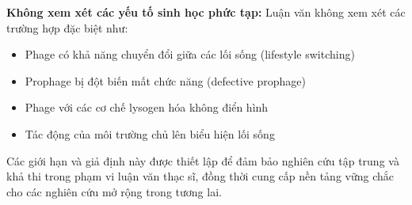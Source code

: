 \textbf{Không xem xét các yếu tố sinh học phức tạp:} Luận văn không xem xét các trường hợp đặc biệt như:
\begin{itemize}
    \item Phage có khả năng chuyển đổi giữa các lối sống (lifestyle switching)
    \item Prophage bị đột biến mất chức năng (defective prophage)
    \item Phage với các cơ chế lysogen hóa không điển hình
    \item Tác động của môi trường chủ lên biểu hiện lối sống
\end{itemize}

Các giới hạn và giả định này được thiết lập để đảm bảo nghiên cứu tập trung và khả thi trong phạm vi luận văn thạc sĩ, đồng thời cung cấp nền tảng vững chắc cho các nghiên cứu mở rộng trong tương lai.

